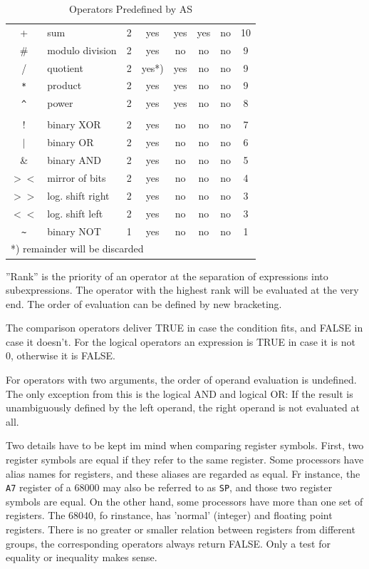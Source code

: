 \documentclass[12pt,twoside]{report}
\newcommand{\asname}{{AS}}
\begin{document}
\begin{table}[htbp]
\begin{center}
\begin{tabular}{|c|l|c|c|c|c|c|c|}
+           & sum              & 2 & yes   & yes & yes & no  & 10 \\
\#          & modulo division  & 2 & yes   & no  & no  & no  & 9 \\
/           & quotient         & 2 & yes*) & yes & no  & no  & 9 \\
\verb! * !  & product          & 2 & yes   & yes & no  & no  & 9 \\
\verb! ^ !  & power            & 2 & yes   & yes & no  & no  & 8 \\
            & & & & & &  \\
$!$         & binary XOR       & 2 & yes   & no  & no  & no  & 7 \\
$|$         & binary OR        & 2 & yes   & no  & no  & no  & 6 \\
\&          & binary AND       & 2 & yes   & no  & no  & no  & 5 \\
$><$        & mirror of bits   & 2 & yes   & no  & no  & no  & 4 \\
$>>$        & log. shift right & 2 & yes   & no  & no  & no  & 3 \\
$<<$        & log. shift left  & 2 & yes   & no  & no  & no  & 3 \\
\verb! ~ !  & binary NOT       & 1 & yes   & no  & no  & no  & 1 \\
\hline
\multicolumn{8}{|l|}{*) remainder will be discarded} \\
\hline
\end{tabular}\end{center}
\caption{Operators Predefined by \asname{}\label{TabOps}}
\end{table}
''Rank'' is the priority of an operator at the separation of expressions
into subexpressions.  The operator with the highest rank will be
evaluated at the very end.  The order of evaluation can be defined by
new bracketing.

The comparison operators deliver TRUE in case the condition fits,
and FALSE in case it doesn't.  For the logical operators an expression
is TRUE in case it is not 0, otherwise it is FALSE.

For operators with two arguments, the order of operand evaluation
is undefined.  The only exception from this is the logical AND and
logical OR: If the result is unambiguously defined by the left
operand, the right operand is not evaluated at all.

Two details have to be kept im mind when comparing register symbols.
First, two register symbols are equal if they refer to the same 
register.  Some processors have alias names for registers, and these
aliases are regarded as equal.  Fr instance, the {\tt A7} register
of a 68000 may also be referred to as {\tt SP}, and those two register
symbols are equal.  On the other hand, some processors have more than
one set of registers.  The 68040, fo rinstance, has 'normal' (integer)
and floating point registers.  There is no greater or smaller relation
between registers from different groups, the corresponding operators
always return FALSE.  Only a test for equality or inequality makes
sense.
\end{document}
